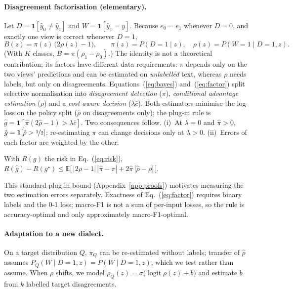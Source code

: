 \paragraph{Disagreement factorisation (elementary).}
Let $D=\mathbf 1[\hat y_0\neq\hat y_1]$ and $W=\mathbf 1[\hat y_1=y]$. Because $e_0=e_1$ whenever $D=0$, and exactly one view is correct whenever $D=1$,
\begin{equation}
B(z)=\pi(z)\,\big(2\rho(z)-1\big),\qquad \pi(z)=P(D{=}1\mid z),\quad \rho(z)=P(W{=}1\mid D{=}1,z).
\label{eq:factor}
\end{equation}
(With $K$ classes, $B=\pi(\rho_1-\rho_0)$.) The identity is not a theoretical contribution; its factors have different data requirements: $\pi$ depends only on the two views' predictions and can be estimated on \emph{unlabelled} text, whereas $\rho$ needs labels, but only on disagreements. Equations~(\ref{eq:bayes}) and~(\ref{eq:factor}) split selective normalisation into \emph{disagreement detection} ($\pi$), \emph{conditional advantage estimation} ($\rho$) and a \emph{cost-aware decision} ($\lambda\bar c$). Both estimators minimise the log-loss on the policy split ($\hat\rho$ on disagreements only); the plug-in rule is $\hat g=\mathbf 1[\hat\pi(2\hat\rho-1)>\lambda\bar c]$. Two consequences follow. (i)~At $\lambda=0$ and $\hat\pi>0$, $\hat g=\mathbf 1[\hat\rho>\nicefrac12]$: re-estimating $\pi$ can change decisions only at $\lambda>0$. (ii)~Errors of each factor are weighted by the other:

\begin{proposition}
\label{prop:regret}
With $R(g)$ the risk in Eq.~(\ref{eq:risk}), $R(\hat g)-R(g^\star)\le\mathbb E\big[\,|2\rho-1|\,|\hat\pi-\pi|+2\hat\pi\,|\hat\rho-\rho|\,\big]$.
\end{proposition}
This standard plug-in bound (Appendix~\ref{app:proofs}) motivates measuring the two estimation errors separately. Exactness of Eq.~(\ref{eq:factor}) requires binary labels and the 0-1 loss; macro-F1 is not a sum of per-input losses, so the rule is accuracy-optimal and only approximately macro-F1-optimal.

\paragraph{Adaptation to a new dialect.}
On a target distribution $Q$, $\pi_Q$ can be re-estimated without labels; transfer of $\hat\rho$ assumes $P_Q(W\mid D{=}1,z)=P(W\mid D{=}1,z)$, which we test rather than assume. When $\rho$ shifts, we model $\rho_Q(z)=\sigma\big(\operatorname{logit}\rho(z)+b\big)$ and estimate $b$ from $k$ labelled target disagreements.

